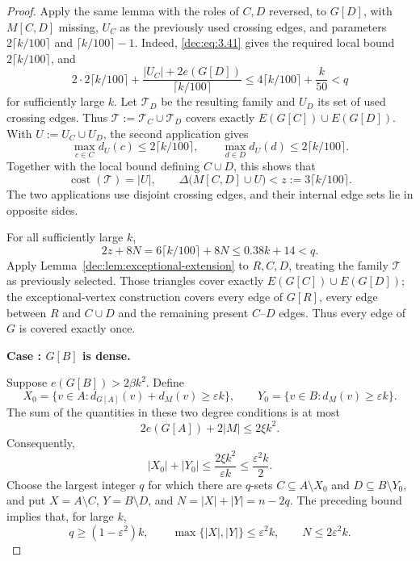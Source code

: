 \documentclass[11pt]{article}
\numberwithin{equation}{section}
\theoremstyle{remark}
\DeclareMathOperator{\cost}{cost}
\newcommand{\e}{\varepsilon}
\newcounter{proofcase}
\newcommand{\proofcase}[2]{
  \refstepcounter{proofcase}
  \par\medskip
  \noindent\textbf{Case \theproofcase: #2.}
  \label{#1}
  \par\smallskip
}
\begin{document}
\begin{proof}
Apply the same lemma with the roles of \(C,D\) reversed, to \(G[D]\),
with \(M[C,D]\) missing, \(U_C\) as the previously used crossing edges, and parameters \(2\lceil k/100\rceil\) and
\(\lceil k/100\rceil-1\).  Indeed, \eqref{dec:eq:3.41} gives the required local bound \(2\lceil k/100\rceil\), and
\begin{equation*}
 2\cdot2\lceil k/100\rceil+\frac{|U_C|+2e(G[D])}{\lceil k/100\rceil}
 \le4\lceil k/100\rceil+\frac k{50}<q
\end{equation*}
for sufficiently large \(k\).  Let \(\mathcal T_D\) be the resulting family and \(U_D\) its set of used crossing edges.
Thus \(\mathcal T:=\mathcal T_C\cup\mathcal T_D\) covers exactly \(E(G[C])\cup E(G[D])\).
With \(U:=U_C\cup U_D\), the second application gives
\begin{equation*}
 \max_{c\in C}d_{U}(c)\le2\lceil k/100\rceil,
 \qquad \max_{d\in D}d_{U}(d)\le2\lceil k/100\rceil.
\end{equation*}
Together with the local bound defining \(C\cup D\), this shows that
\begin{equation*}
 \cost(\mathcal T)=|U|,
 \qquad
 \Delta\bigl(M[C,D]\cup U\bigr)< z:=3\lceil k/100\rceil.
\end{equation*}
The two applications use disjoint crossing edges, and their internal edge sets lie in opposite sides.

For all sufficiently large \(k\),
\begin{equation*}
  2z+8N
  =6\lceil k/100\rceil+8N
  \le0.38k+14<q.
\end{equation*}
Apply Lemma~\ref{dec:lem:exceptional-extension} to \(R,C,D\), treating the
family \(\mathcal T\) as previously selected.  Those triangles cover exactly
\(E(G[C])\cup E(G[D])\); the exceptional-vertex construction covers every
edge of \(G[R]\), every edge between \(R\) and \(C\cup D\) and
the remaining present \(C\)--\(D\) edges.  Thus every edge of \(G\) is covered exactly once.
\proofcase{dec:case:dense-side}
  {\(G[B]\) is dense}
Suppose \(e(G[B])>2\beta k^2\).  Define
\begin{equation*}
 X_0=\{v\in A:d_{G[A]}(v)+d_M(v)\ge\e k\},\qquad
 Y_0=\{v\in B:d_M(v)\ge\e k\}.
\end{equation*}
The sum of the quantities in these two degree conditions is at most
\begin{equation*}
  2e(G[A])+2|M|\le2\xi k^2.
\end{equation*}
Consequently,
\begin{equation*}
  |X_0|+|Y_0|\le\frac{2\xi k^2}{\e k}\le\frac{\e^2k}{2}.
\end{equation*}
Choose the largest integer \(q\) for which there are \(q\)-sets
\(C\subseteq A\setminus X_0\) and \(D\subseteq B\setminus Y_0\), and
put \(X=A\setminus C\), \(Y=B\setminus D\), and \(N=|X|+|Y|=n-2q\).
The preceding bound implies that, for large \(k\),
\begin{equation}\label{dec:eq:3.44}
 q\ge(1-\e^2)k,\qquad
 \max\{|X|,|Y|\}\le\e^2k,\qquad N\le2\e^2k.
\end{equation}


\end{proof}
\end{document}
